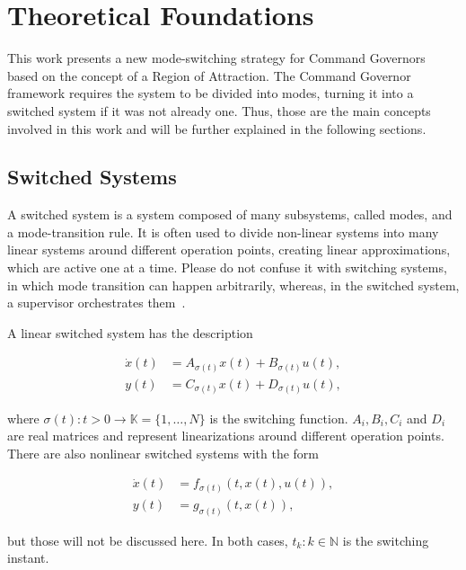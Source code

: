 
\chapter{Theoretical Foundations}%
\label{chp:theoretical-foundations}

This work presents a new mode-switching strategy for Command Governors based on
the concept of a Region of Attraction. The Command Governor framework requires
the system to be divided into modes, turning it into a switched system if it was
not already one. Thus, those are the main concepts involved in this work and
will be further explained in the following sections.

\section{Switched Systems}%
\label{sec:switched-systems}

A switched system is a system composed of many subsystems, called modes, and a
mode-transition rule. It is often used to divide non-linear systems into many
linear systems around different operation points, creating linear
approximations, which are active one at a time. Please do not confuse it with
switching systems, in which mode transition can happen arbitrarily, whereas, in
the switched system, a supervisor orchestrates
them~\parencite{lucia.franzè:stabilization,liberzon.morse:basic}.

A linear switched system has the description

\begin{align}
	\dot{x}(t) & = A_{\sigma(t)}x(t) + B_{\sigma(t)}u(t), \\
	y(t)       & = C_{\sigma(t)}x(t) + D_{\sigma(t)}u(t),
\end{align}

where \(\sigma(t):t>0\rightarrow\mathbb{K}=\{1,\ldots,N\}\) is the switching function.
\(A_{i}, B_{i}, C_{i}\) and \(D_{i}\) are real matrices and represent
linearizations around different operation points. There are also nonlinear
switched systems with the form

\begin{align}
	\dot{x}(t) & = f_{\sigma(t)}(t,x(t),u(t)), \\
	y(t)       & = g_{\sigma(t)}(t,x(t)),
\end{align}

but those will not be discussed here. In both cases, \(t_{k}:k\in\mathbb{N}\) is
the switching instant.

